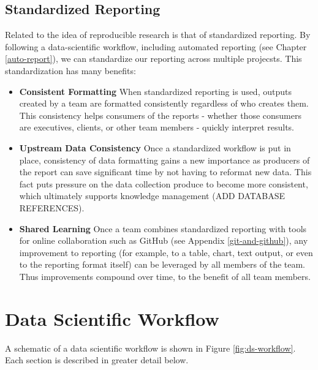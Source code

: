 \documentclass[
]{book}
\providecommand{\tightlist}{%
  \setlength{\itemsep}{0pt}\setlength{\parskip}{0pt}}
\begin{document}
\hypertarget{standardized-reporting}{%
\subsection{Standardized Reporting}\label{standardized-reporting}}

Related to the idea of reproducible research is that of standardized reporting. By following a data-scientific workflow, including automated reporting (see Chapter \ref{auto-report}), we can standardize our reporting across multiple projecsts. This standardization has many benefits:

\begin{itemize}
\tightlist
\item
  \textbf{Consistent Formatting} When standardized reporting is used, outputs created by a team are formatted consistently regardless of who creates them. This consistency helps consumers of the reports - whether those consumers are executives, clients, or other team members - quickly interpret results.
\item
  \textbf{Upstream Data Consistency} Once a standardized workflow is put in place, consistency of data formatting gains a new importance as producers of the report can save significant time by not having to reformat new data. This fact puts pressure on the data collection produce to become more consistent, which ultimately supports knowledge management (ADD DATABASE REFERENCES).
\item
  \textbf{Shared Learning} Once a team combines standardized reporting with tools for online collaboration such as GitHub (see Appendix \ref{git-and-github}), any improvement to reporting (for example, to a table, chart, text output, or even to the reporting format itself) can be leveraged by all members of the team. Thus improvements compound over time, to the benefit of all team members.
\end{itemize}

\hypertarget{data-scientific-workflow}{%
\section{Data Scientific Workflow}\label{data-scientific-workflow}}

A schematic of a data scientific workflow is shown in Figure \ref{fig:ds-workflow}. Each section is described in greater detail below.
\end{document}
